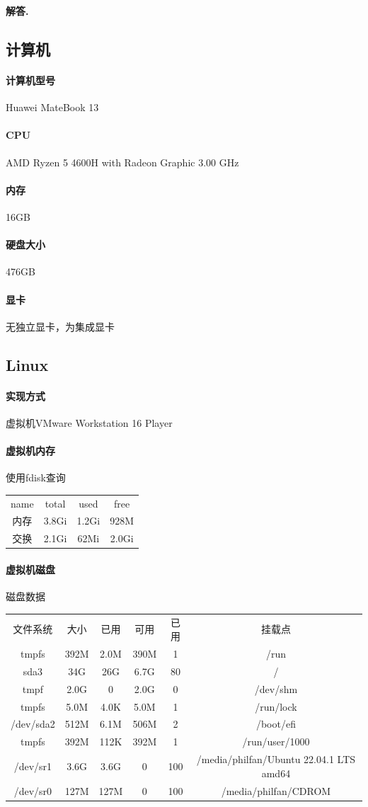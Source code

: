 \documentclass[12pt, a4paper, oneside]{ctexart}
\newenvironment{solution}{\par\noindent\textbf{解答. }}{\\\par}
\begin{document}
\begin{solution}
	\setcounter{section}{1}
	\subsection{计算机}
		\paragraph{计算机型号}Huawei MateBook 13
		\paragraph{CPU}AMD Ryzen 5 4600H with Radeon Graphic 3.00 GHz
		\paragraph{内存}16GB			
		\paragraph{硬盘大小}476GB
		\paragraph{显卡}无独立显卡，为集成显卡
	\subsection{Linux}
		\paragraph{实现方式}虚拟机VMware Workstation 16 Player\\
		\paragraph{虚拟机内存}
		使用fdisk查询\\
	\begin{tabular}{cccc}
		\hline
		name&total&used&free\\
		内存&3.8Gi&1.2Gi&928M\\
		交换&2.1Gi&62Mi&2.0Gi\\
		\hline
	\end{tabular}
		\paragraph{虚拟机磁盘}
		磁盘数据\\
\begin{tabular}{cccccc}
	\hline
	文件系统& 大小& 已用&  可用& 已用& 挂载点\\
	tmpfs&392M&2.0M&390M&1&/run\\
	sda3&34G&26G&6.7G&80&/\\
	tmpf&2.0G&0&2.0G&0&/dev/shm\\
	tmpfs&5.0M&4.0K&5.0M&1&/run/lock\\
	/dev/sda2&512M&6.1M&506M&2&/boot/efi\\
	tmpfs&392M&112K&392M&1&/run/user/1000\\
	/dev/sr1&3.6G& 3.6G&0&100&/media/philfan/Ubuntu 22.04.1 LTS amd64\\
	/dev/sr0&127M&127M&0&100&/media/philfan/CDROM\\
	\hline
\end{tabular}

\end{solution}
\end{document}

